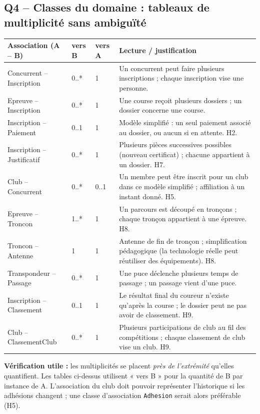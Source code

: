 \documentclass[10pt,a4paper]{article}
\begin{document}
\subsection{Q4 -- Classes du domaine : tableaux de multiplicité sans ambiguïté}
\small\begin{longtable}{@{}p{42mm}p{13mm}p{14mm}p{80mm}@{}}\toprule
Association (A -- B) & vers B & vers A & Lecture / justification \\ \midrule\endhead
Concurrent -- Inscription & 0..* & 1 & Un concurrent peut faire plusieurs inscriptions ; chaque inscription vise une personne.\\
Epreuve -- Inscription & 0..* & 1 & Une course reçoit plusieurs dossiers ; un dossier concerne une course.\\
Inscription -- Paiement & 0..1 & 1 & Modèle simplifié : un seul paiement associé au dossier, ou aucun si en attente. H2.\\
Inscription -- Justificatif & 0..* & 1 & Plusieurs pièces successives possibles (nouveau certificat) ; chacune appartient à un dossier. H7.\\
Club -- Concurrent & 0..* & 0..1 & Un membre peut être inscrit pour un club dans ce modèle simplifié ; affiliation à un instant donné. H5.\\
Epreuve -- Troncon & 1..* & 1 & Un parcours est découpé en tronçons ; chaque tronçon appartient à une épreuve. H8.\\
Troncon -- Antenne & 1 & 1 & Antenne de fin de tronçon ; simplification pédagogique (la technologie réelle peut réutiliser des équipements). H8.\\
Transpondeur -- Passage & 0..* & 1 & Une puce déclenche plusieurs temps de passage ; un passage vient d'une puce.\\
Inscription -- Classement & 0..1 & 1 & Le résultat final du coureur n'existe qu'après la course ; le dossier peut ne pas avoir de classement. H9.\\
Club -- ClassementClub & 0..* & 1 & Plusieurs participations de club au fil des compétitions ; chaque classement de club vise un club. H9.\\
\bottomrule\end{longtable}\normalsize
\textbf{Vérification utile :} les multiplicités se placent \emph{près de l'extrémité} qu'elles quantifient. Les tables ci-dessus utilisent « vers B » pour la quantité de B par instance de A. L'association du club doit pouvoir représenter l'historique si les adhésions changent ; une classe d'association \texttt{Adhesion} serait alors préférable (H5).
\end{document}
